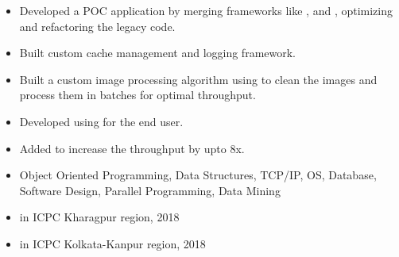 \documentclass[10pt,a4paper,ragged2e, normalphoto]{altacv}
\begin{document}
\begin{itemize}
  \item Developed a POC application by merging frameworks like ,  and , optimizing and refactoring the legacy code.
  \item Built custom cache management and logging framework.
 \end{itemize}
\vspace{4pt}
\begin{itemize}
  \item Built a custom image processing algorithm using  to clean the images and process them in batches for optimal throughput.
  \item Developed  using  for the end user.
  \item Added  to increase the throughput by upto 8x.
 \end{itemize}
 
 
\begin{itemize}
  \item {} Object Oriented Programming, Data Structures, TCP/IP, OS, Database, Software Design, Parallel Programming, Data Mining%
\end{itemize}

\begin{itemize}
    \item {} in ICPC Kharagpur region, 2018
    \item {} in ICPC Kolkata-Kanpur region, 2018
 \end{itemize}
\end{document}
